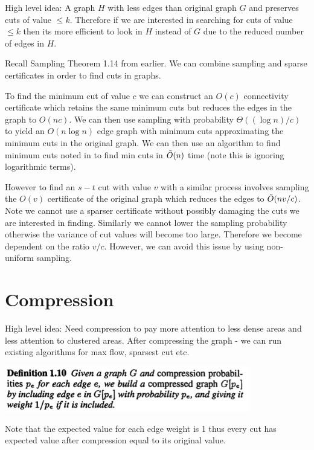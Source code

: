 \documentclass[11pt]{article}
\begin{document}
High level idea: A graph $H$ with less edges than original graph $G$ and preserves cuts of value $\le k$. Therefore if we are interested in searching for cuts of value $\le k$ then its more efficient to look in $H$ instead of $G$ due to the reduced number of edges in $H$.

Recall Sampling Theorem 1.14 from earlier. We can combine sampling and sparse certificates in order to find cuts in graphs.

To find the minimum cut of value $c$ we can construct an $O(c)$ connectivity certificate which retains the same minimum cuts but reduces the edges in the graph to $O(nc)$. We can then use sampling with probability $\Theta((\log n)/c)$ to yield an $O(n\log n)$ edge graph with minimum cuts approximating the minimum cuts in the original graph. We can then use an algorithm to find minimum cuts noted in \cite{Gab95} to find min cuts in $\Tilde{O}(n)$ time (note this is ignoring logarithmic terms).

However to find an $s-t$ cut with value $v$ with a similar process involves sampling the $O(v)$ certificate of the original graph which reduces the edges to $\Tilde{O}(nv/c)$. Note we cannot use a sparser certificate without possibly damaging the cuts we are interested in finding. Similarly we cannot lower the sampling probability otherwise the variance of cut values will become too large. Therefore we become dependent on the ratio $v/c$. However, we can avoid this issue by using non-uniform sampling.

\section{Compression}

High level idea: Need compression to pay more attention to less dense areas and less attention to clustered areas. After compressing the graph - we can run existing algorithms for max flow, sparsest cut etc. 

\begin{center}
\includegraphics[width=0.8\textwidth]{figures/Def1_10.png}
\end{center}

Note that the expected value for each edge weight is 1 thus every cut has expected value after compression equal to its original value.
\end{document}

